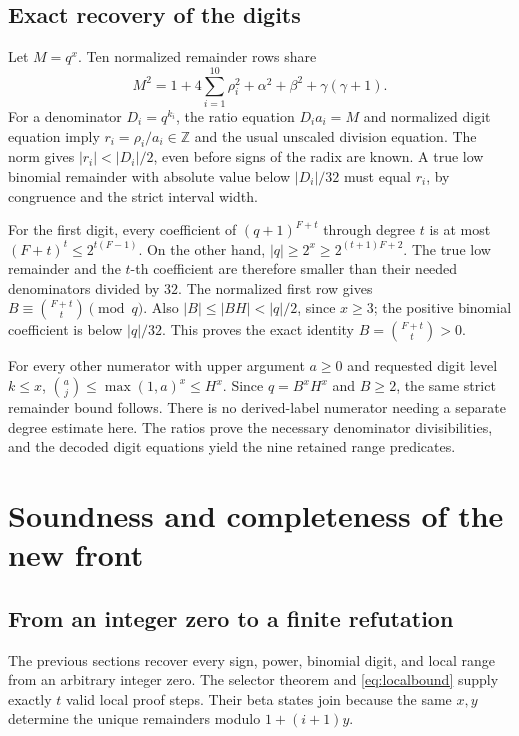 \documentclass[11pt]{article}
\theoremstyle{definition}\newtheorem{remark}[theorem]{Remark}
\newcommand{\Z}{\mathbb Z}\newcommand{\N}{\mathbb N}\newcommand{\Q}{\mathbb Q}
\begin{document}
\subsection{Exact recovery of the digits}

Let $M=q^x$. Ten normalized remainder rows share
\begin{equation}\label{eq:remaindernorm}
 M^2=1+4\sum_{i=1}^{10}\rho_i^2+\alpha^2+\beta^2+\gamma(\gamma+1).
\end{equation}
For a denominator $D_i=q^{k_i}$, the ratio equation
$D_i a_i=M$ and normalized digit equation imply
$r_i=\rho_i/a_i\in\Z$ and the usual unscaled division equation.
The norm gives $|r_i|<|D_i|/2$, even before signs of the radix
are known. A true low binomial remainder with absolute value below
$|D_i|/32$ must equal $r_i$, by congruence and the strict interval width.

For the first digit, every coefficient of $(q+1)^{F+t}$ through degree
$t$ is at most $(F+t)^t\le2^{t(F-1)}$. On the other hand,
$|q|\ge2^x\ge2^{(t+1)F+2}$. The true low remainder and the
$t$-th coefficient are therefore smaller than their needed denominators
divided by $32$. The normalized first row gives
$B\equiv \binom{F+t}{t}\pmod q$. Also
$|B|\le|BH|<|q|/2$, since $x\ge3$; the positive binomial coefficient
is below $|q|/32$. This proves the exact identity
$B=\binom{F+t}{t}>0$.

For every other numerator with upper argument $a\ge0$ and requested
digit level $k\le x$,
$\binom{a}{j}\le\max(1,a)^x\le H^x$. Since $q=B^xH^x$ and
$B\ge2$, the same strict remainder bound follows. There is no
derived-label numerator needing a separate degree estimate here.
The ratios prove the necessary denominator divisibilities, and the
decoded digit equations yield the nine retained range predicates.

\section{Soundness and completeness of the new front}

\subsection{From an integer zero to a finite refutation}

The previous sections recover every sign, power, binomial digit, and
local range from an arbitrary integer zero. The selector theorem and
\eqref{eq:localbound} supply exactly $t$ valid local proof steps.
Their beta states join because the same $x,y$ determine the unique
remainders modulo $1+(i+1)y$.
\end{document}
